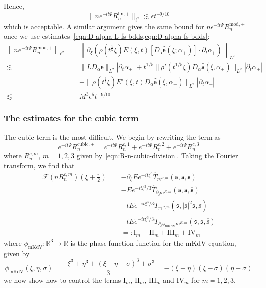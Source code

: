 \documentclass[letterpaper, reqno,final]{amsart}
\newcommand{\bbR}{\mathbb{R}}
\newcommand{\fs}{\mathfrak{s}}
\newcommand{\fhPi}{\frac{\pi}{2}}
\newcommand{\rmI}{\mathrm{I}}
\newcommand{\rmII}{\mathrm{II}}
\newcommand{\rmIII}{\mathrm{III}}
\newcommand{\rmIV}{\mathrm{IV}}
\newcommand{\SSCutoff}[1][\xi]{\rho(t^\frac{1}{5} #1)}
\newcommand{\discrAvg}{\Psi}
\newcommand{\invLinProp}[1][t]{e^{-i#1\discrAvg}}
\newcommand{\tmkdv}{\text{mKdV}}
\newcommand{\Rncp}[1]{R_n^{c,{#1}}}
\begin{document}
Hence,
\begin{equation*}
    \lVert n \invLinProp  R_n^{\text{lin},+} \rVert_{\ell^2} \lesssim \epsilon t^{-9/10}
\end{equation*}
which is acceptable.  A similar argument gives the same bound for $n\invLinProp R_n^{\text{mod},+}$ once we use estimates~\cref{eqn:D-alpha-L-fs-bdds,eqn:D-alpha-fs-bdds}:
\begin{equation*}\begin{split}
    \left\lVert n \invLinProp  R_n^{\text{mod},+} \right\rVert_{\ell^2} =& \left\lVert \partial_{\xi} \left(\SSCutoff E(\xi,t) \left[D_\alpha \hat{\fs}(\xi;\alpha_+)\right] \cdot \partial_t \alpha_+\right) \right\rVert_{L^2}\\
    \lesssim& \lVert L D_\alpha \fs \rVert_{L^2}|\partial_t \alpha_+| + t^{{1/5}} \lVert \rho'(t^{1/5} \xi) D_\alpha \hat{\fs}(\xi,\alpha_+)\rVert_{L^2} |\partial_t \alpha_+|\\
    &+ \lVert \rho(t^{\frac{1}{5}}\xi) E'(\xi,t) D_{\alpha} \hat{\fs}(\xi, \alpha_+) \rVert_{L^2} |\partial_t \alpha_+|\\
    \lesssim& M^3\epsilon^5 t^{-9/10}
\end{split}\end{equation*}

\subsubsection{The estimates for the cubic term} 
The cubic term is the most difficult.  We begin by rewriting the term as
\begin{equation*}
    \invLinProp R^{\text{cubic},+}_n = \invLinProp \Rncp{1} + \invLinProp \Rncp{2} + \invLinProp \Rncp{3}
\end{equation*}
where $\Rncp{m}$, $m=1,2,3$ given by~\eqref{eqn:R-n-cubic-division}.
Taking the Fourier transform, we find that
\begin{equation}\label{eqn:R-cubic-nonlin-div}\begin{split}
    \mathcal{F}\left(n \Rncp{m}\right)(\xi + \fhPi) =& -\partial_\xi E e^{-it\xi^3} \hat{T}_{m^{R,m}}(\fs, \fs, \overline{\fs})\\
    &- E e^{-it\xi^3/3} \hat{T}_{\partial_\xi m^{R,m}}(\fs, \fs, \overline{\fs})\\
    &- tE e^{-it\xi^3/3} \hat{T}_{m^{R,m}}( \fs, |\fs|^2\fs, \overline{\fs})\\
    &- tE e^{-it\xi^3/3} \hat{T}_{\partial_\xi \phi_{\tmkdv}m^{R,m}}(\fs, \fs, \overline{\fs})\\
    &=: \rmI_m + \rmII_m + \rmIII_m + \rmIV_m
\end{split}\end{equation}
where $\phi_{\tmkdv}: \bbR^3 \to \bbR$ is the phase function function for the mKdV equation, given by
\begin{equation*}
    \phi_{\tmkdv}(\xi,\eta,\sigma) = \frac{-\xi^3 + \eta^3 + (\xi - \eta - \sigma)^3 + \sigma^3}{3} = - (\xi - \eta)(\xi - \sigma)(\eta + \sigma)
\end{equation*}
we now show how to control the terms $\rmI_m$, $\rmII_m$, $\rmIII_m$ and $\rmIV_m$ for $m=1,2,3$.
\end{document}
